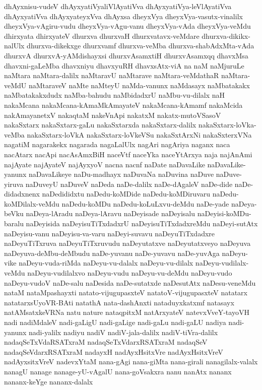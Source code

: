 {dhAyxnisu-vudeV
dhAyxyatiVyaliVlAyatiVva
dhAyxyatiVya-leVlAyatiVva
dhAyxyatiVva
dhAyxyateyxVva
dhAyxsa
dheyxVya
dheyxVya-vasutx-vinalilx
dheyxVya-vAgiru-vudu
dheyxVya-vAgu-vanu
dheyxVya-vAda
dheyxVya-veMdu
dhirxyata
dhirxyateV
dhurxva
dhurxvaH
dhurxvatavx-veMdare
dhurxva-dikikx-nalUlx
dhurxva-dikekxge
dhurxvamf
dhurxva-veMba
dhurxva-shabAdxMta-vAda
dhurxvA
dhurxvA-yAMdishayxsi
dhurxvAsamxtiH
dhurxvAsamxqq
dhavxMsa
dhavxni-gaLeMba
dhavxniyu
dhavxyuRH
dhavxsAtx-viA
na
naM
naMjuruLe
naMtara
naMtara-dalilx
naMtaravU
naMtarave
naMtara-veMdathaR
naMtara-veMdU
naMtaraveV
naMte
naMteyU
naMda-vanunx
naMdasayx
naMbatakakx
naMbatakakxdudx
naMba-bahudu
naMbidadxrU
naMbu-vu-dilalx
naH
nakaMcana
nakaMcana-kAmaMkAmayateV
nakaMcana-kAmamf
nakaMcida
nakAmayanetxV
nakaqtaM
nakeVnApi
nakatxM
nakatx-mutoVSasoV
nakaSxtarx
nakaSxtarx-gaLu
nakaSxtarxda
nakaSxtarx-dalilx
nakaSxtarx-loVka-veMba
nakaSxtarx-loVkA
nakaSxtarx-loVkeVSu
nakaSxtArxNi
nakaSxterxVNa
nagatiM
nagarakekx
nagarada
nagaLalUlx
nagAri
nagAriya
naganx
naca
nacAtarx
nacApi
nacAsAmxBiH
naceVtf
naceYka
naceYtArxya
naja
najAnAmi
najAyate
najAyateV
najAyxyoV
nacna
nacnf
naDate
naDavaLike
naDavaLike-yanunx
naDavaLikeye
naDu-madhayx
naDuvaNa
naDuvina
naDuve
naDuve-yiruva
naDuveyU
naDuveV
naDeda
naDe-dalilx
naDe-dAgaleV
naDe-dide
naDe-didadxnenx
naDedididxtu
naDedu-koMDide
naDedu-koMDiruvaru
naDedu-koMDilalx-veMdu
naDedu-koMDu
naDedu-koLuLxvu-deMdu
naDe-yade
naDeya-beVku
naDeya-lAradu
naDeya-lAravu
naDeyisade
naDeyisalu
naDeyisi-koMDu-baralu
naDeyisida
naDeyisuTiTxdadxrU
naDeyisuTiTxdadxreMdu
naDeyi-sutAtx
naDeyisu-vanu
naDeyisu-va-varu
naDeyi-suvavu
naDeyuTiTxdadxre
naDeyuTiTxruva
naDeyuTiTxruvudu
naDeyutatxve
naDeyutatxveyo
naDeyuva
naDeyuva-deMbu-deMbudu
naDe-yuvanu
naDe-yuvavu
naDe-yuvAga
naDeyu-vike
naDeyu-vuda-riMda
naDeyu-vu-dalalx
naDeyu-vu-dilalx
naDeyu-vudilalx-veMdu
naDeyu-vudilalxvo
naDeyu-vudu
naDeyu-vu-deMdu
naDeyu-vudo
naDeyu-vudoV
naDe-salu
naDesida
naDe-sutatxde
naDesutAtx
naDesu-veneMdu
nataM
nataMpashayxti
natato-vijugupasxteV
natatoV-vijugupasxteV
natatarx
natatarxsUyoVR-BAti
natathA
nata-dashAnxti
nataduyxkatxmf
natasayx
natAMsatxkeVRNa
natu
nature
nataqpitxM
natArxyateV
natevxVveY-tayoVH
nadi
nadiMdaleV
nadi-gaLigU
nadi-gaLige
nadi-gaLu
nadi-gaLU
nadiya
nadi-yanunx
nadi-yalilx
nadiyu
nadiV
nadiV-jala-dalilx
nadiV-tiVra-dalilx
nadaqSeTxVdaRSATxraM
nadaqSeTxVdarxRSATxraM
nadaqSeV
nadaqSeVdarxRSATxraM
nadayxH
nadAyxHsitxVre
nadAyxHsitxVreV
nadAyxsitxVreV
nadevxYtaM
nana-gAgi
nana-giMta
nana-girali
nanagilalx-valalx
nanagU
nanage
nanage-yU-vAgalU
nana-goVsakxra
nanu
nanAtx
nananx
nananx-keYge
nananx-dalalx
}
